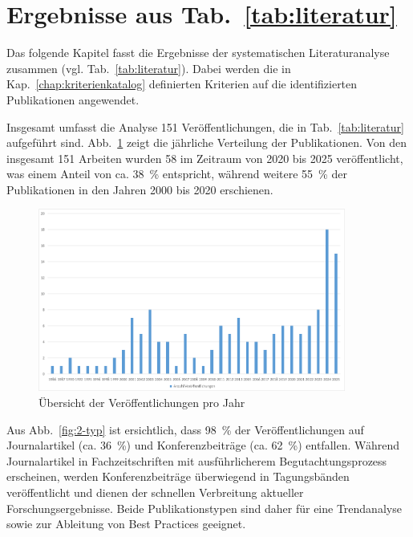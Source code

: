 \section{Ergebnisse aus Tab.~\ref{tab:literatur}}

Das folgende Kapitel fasst die Ergebnisse der systematischen Literaturanalyse zusammen (vgl. Tab.~\ref{tab:literatur}). Dabei werden die in Kap.~\ref{chap:kriterienkatalog} definierten Kriterien auf die identifizierten Publikationen angewendet.

\newline
Insgesamt umfasst die Analyse 151 Veröffentlichungen, die in Tab.~\ref{tab:literatur} aufgeführt sind. Abb.~\ref{fig:1-veroeffentlichungen-jahr} zeigt die jährliche Verteilung der Publikationen. Von den insgesamt 151 Arbeiten wurden 58 im Zeitraum von 2020 bis 2025 veröffentlicht, was einem Anteil von ca. 38~\% entspricht, während weitere 55~\% der Publikationen in den Jahren 2000 bis 2020 erschienen.

\begin{figure}[!htbp]
    \centering
    \includegraphics[width=0.90\textwidth]{graphics/1-veroeffentlichungen-jahr.png}
    \caption{Übersicht der Veröffentlichungen pro Jahr}
    \label{fig:1-veroeffentlichungen-jahr}
\end{figure}

Aus Abb.~\ref{fig:2-typ} ist ersichtlich, dass 98~\% der Veröffentlichungen auf Journalartikel (ca. 36~\%) und Konferenzbeiträge (ca. 62~\%) entfallen. Während Journalartikel in Fachzeitschriften mit ausführlicherem Begutachtungsprozess erscheinen, werden Konferenzbeiträge überwiegend in Tagungsbänden veröffentlicht und dienen der schnellen Verbreitung aktueller Forschungsergebnisse. Beide Publikationstypen sind daher für eine Trendanalyse sowie zur Ableitung von Best Practices geeignet.

